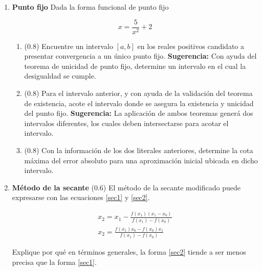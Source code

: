 \documentclass[12pt]{article}
\begin{document}
\vspace{1cm}
  \begin{enumerate}[leftmargin=*,widest=9]

    \item \textbf{Punto fijo} Dada la forma funcional de punto fijo

    \begin{equation*}
    x = \frac{5}{x^2} + 2
    \end{equation*}

    \begin{enumerate}[label=\alph*]
    \item (\(0.8\)) Encuentre un intervalo \([a, b]\) en los reales positivos candidato a presentar convergencia a un único punto fijo. \textbf{Sugerencia:} Con ayuda del teorema de unicidad de punto fijo, determine un intervalo en el cual la desigualdad se cumple.

   \vspace{7cm}



    \item (\(0.8\)) Para el intervalo anterior, y con ayuda de la validación del teorema de existencia, acote el intervalo donde se asegura la existencia y unicidad del punto fijo. \textbf{Sugerencia:} La aplicación de ambos teoremas generá dos intervalos diferentes, los cuales deben intersectarse para acotar el intervalo.

    \vspace{7cm}


   \item (\(0.8\)) Con la información de los dos literales anteriores, determine la cota máxima del error absoluto para una aproximación inicial ubicada en dicho intervalo.

   \vspace{5cm}

   \end{enumerate}

   \item \textbf{Método de la secante} (\(0.6\)) El método de la secante modificado puede expresarse con las ecuaciones \ref{sec1} y \ref{sec2}.

   \begin{eqnarray}
   x_2 = x_1 - \frac{f(x_1)(x_1 - x_0)}{f(x_1) - f(x_0)} \label{sec1}\\
   x_2 = \frac{f(x_1)x_0 - f(x_0)x_1}{f(x_1) - f(x_0)} \label{sec2}
   \end{eqnarray}

   Explique por qué en términos generales, la forma \ref{sec2} tiende a ser menos precisa que la forma \ref{sec1}.


\end{enumerate}
\end{document}
